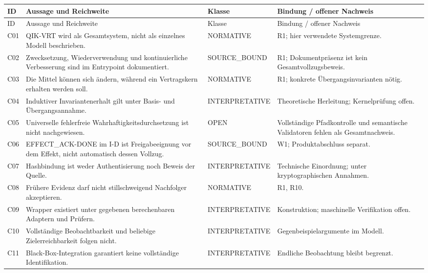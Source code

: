 \par
{\tighttable
\begin{longtable}{@{}p{11mm}p{66mm}p{25mm}p{52mm}@{}}\toprule
ID & Aussage und Reichweite & Klasse & Bindung / offener Nachweis\\\midrule\endfirsthead\toprule ID & Aussage und Reichweite & Klasse & Bindung / offener Nachweis\\\midrule\endhead
C01 & QIK-VRT wird als Gesamtsystem, nicht als einzelnes Modell beschrieben. & NORMATIVE & R1; hier verwendete Systemgrenze.\\
C02 & Zwecksetzung, Wiederverwendung und kontinuierliche Verbesserung sind im Entrypoint dokumentiert. & SOURCE\_BOUND & R1; Dokumentpräsenz ist kein Gesamtvollzugsbeweis.\\
C03 & Die Mittel können sich ändern, während ein Vertragskern erhalten werden soll. & NORMATIVE & R1; konkrete Übergangsinvarianten nötig.\\
C04 & Induktiver Invariantenerhalt gilt unter Basis- und Übergangsannahme. & INTERPRETATIVE & Theoretische Herleitung; Kernelprüfung offen.\\
C05 & Universelle fehlerfreie Wahrhaftigkeitsdurchsetzung ist nicht nachgewiesen. & OPEN & Vollständige Pfadkontrolle und semantische Validatoren fehlen als Gesamtnachweis.\\
C06 & EFFECT\_ACK-DONE im I-D ist Freigabeeignung vor dem Effekt, nicht automatisch dessen Vollzug. & SOURCE\_BOUND & W1; Produktabschluss separat.\\
C07 & Hashbindung ist weder Authentisierung noch Beweis der Quelle. & INTERPRETATIVE & Technische Einordnung; unter kryptographischen Annahmen.\\
C08 & Frühere Evidenz darf nicht stillschweigend Nachfolger akzeptieren. & NORMATIVE & R1, R10.\\
C09 & Wrapper existiert unter gegebenen berechenbaren Adaptern und Prüfern. & INTERPRETATIVE & Konstruktion; maschinelle Verifikation offen.\\
C10 & Vollständige Beobachtbarkeit und beliebige Zielerreichbarkeit folgen nicht. & INTERPRETATIVE & Gegenbeispielargumente im Modell.\\
C11 & Black-Box-Integration garantiert keine vollständige Identifikation. & INTERPRETATIVE & Endliche Beobachtung bleibt begrenzt.\\

\end{longtable}}
